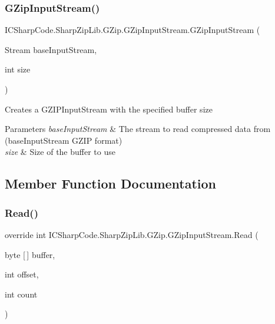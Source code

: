 \subsubsection{\texorpdfstring{G\+Zip\+Input\+Stream()}{GZipInputStream()}\hspace{0.1cm}{\footnotesize\ttfamily [2/2]}}
{\footnotesize\ttfamily I\+C\+Sharp\+Code.\+Sharp\+Zip\+Lib.\+G\+Zip.\+G\+Zip\+Input\+Stream.\+G\+Zip\+Input\+Stream (\begin{DoxyParamCaption}\item[{Stream}]{base\+Input\+Stream,  }\item[{int}]{size }\end{DoxyParamCaption})\hspace{0.3cm}{\ttfamily [inline]}}



Creates a G\+Z\+I\+P\+Input\+Stream with the specified buffer size 


\begin{DoxyParams}{Parameters}
{\em base\+Input\+Stream} & The stream to read compressed data from (base\+Input\+Stream G\+Z\+IP format) \\
\hline
{\em size} & Size of the buffer to use \\
\hline
\end{DoxyParams}


\subsection{Member Function Documentation}
\mbox{\label{class_i_c_sharp_code_1_1_sharp_zip_lib_1_1_g_zip_1_1_g_zip_input_stream_a40e8589437e1082b5077afc7d749f78a}} 
\subsubsection{\texorpdfstring{Read()}{Read()}}
{\footnotesize\ttfamily override int I\+C\+Sharp\+Code.\+Sharp\+Zip\+Lib.\+G\+Zip.\+G\+Zip\+Input\+Stream.\+Read (\begin{DoxyParamCaption}\item[{byte \mbox{[}$\,$\mbox{]}}]{buffer,  }\item[{int}]{offset,  }\item[{int}]{count }\end{DoxyParamCaption})\hspace{0.3cm}{\ttfamily [inline]}}



